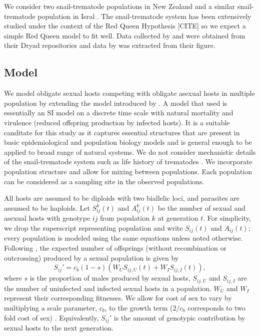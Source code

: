 \documentclass{article}\usepackage[]{graphicx}\usepackage[]{color}
\begin{document}
We consider two snail-trematode populations in New Zealand \citep{vergara2014infection, mckone2016fine} and a similar snail-trematode population in Isral \citep{dagan2013clonal}. 
The snail-trematode system has been extensively studied under the context of the Red Queen Hypothesis [CITE] so we expect a simple Red Queen model to fit well.
Data collected by \cite{dagan2013clonal} and \cite{vergara2014infection} were obtained from their Dryad repositories \citep{dryad_f5t56, dryad_29nk3_2} and data by \cite{mckone2016fine} was extracted from their figure.

\subsection{Model}

We model obligate sexual hosts competing with obligate asexual hosts in multiple population by extending the model introduced by \cite{lively2010epidemiological}.
A model that \cite{lively2010epidemiological} used is essentially an SI model on a discrete time scale with natural mortality and virulence (reduced offspring production by infected hosts).
It is a suitable canditate for this study as it captures essential structures that are present in basic epidemiological and population biology models and is general enough to be applied to broad range of natural systems.
We do not consider mechanistic details of the snail-trematode system such as life history of trematodes \citep{vergara2014infection}.
We incorporate population structure and allow for mixing between populations.
Each population can be considered as a sampling site in the observed populations.

All hosts are assumed to be diploids with two biallelic loci, and parasites are assumed to be haploids.
Let $S_{ij}^k(t)$ and $A_{ij}^k(t)$ be the number of sexual and asexual hosts with genotype $ij$ from population $k$ at generation $t$. 
For simplicity, we drop the superscript representing population and write $S_{ij}(t)$ and $A_{ij}(t)$;
every population is modeled using the same equations unless noted otherwise.
Following \cite{lively2010epidemiological}, the expected number of offsprings (without recombination or outcrossing) produced by a sexual population is given by
\begin{equation}
S_{ij}' = c_b (1-s) \left(W_U S_{ij,U} (t) + W_I S_{ij,I} (t)\right),
\end{equation}
where $s$ is the proportion of males produced by sexual hosts, $S_{ij, U}$ and $S_{ij,I}$ are the number of uninfected and infected sexual hosts in a population.
$W_U$ and $W_I$ represent their corresponding fitnesses.
We allow for cost of sex to vary by multiplying a scale parameter, $c_b$, to the growth term ($2/c_b$ corresponds to two fold cost of sex) \citep{ashby2015diversity}.
Equivalently, $S_{ij}'$ is the amount of genotypic contribution by sexual hosts to the next generation.
\end{document}
